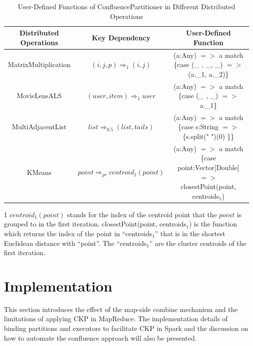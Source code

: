 \documentclass[10pt,journal,compsoc]{IEEEtran}
\begin{document}
\begin{table}[!t]
\begin{threeparttable}[b]
\renewcommand{\arraystretch}{1}
\caption{User-Defined Functions of ConfluencePartitioner in Different Distributed Operations}
\label{table:code}
\centering
\begin{tabularx}{1\textwidth}{ c || c |c  }
\hline
\textbf{Distributed Operations} & \textbf{Key Dependency} & \textbf{User-Defined Function} \\
\hline
MatrixMultiplication & $(i,j,p) \Rightarrow_{1} (i,j)$ & (a:Any) $=>$ a match \{case (\_ , \_, \_) $=>$ (a.\_1, a.\_2)\}\\
\hline
MovieLensALS  &$(user,item) \Rightarrow_{1} user$ & (a:Any) $=>$ a match \{case (\_ , \_) $=>$ a.\_1\} \\%
\hline
MultiAdjacentList  & $list \Rightarrow_{0.5} (list, tails)$ & (a:Any) $=>$ a match \{case s:String $=>$ \{s.split(" ")(0) \}\}\\
\hline
KMeans & $point \Rightarrow_{pr} centroid_1(point)$ & (a:Any) $=>$ a match \{case point:Vector[Double] $=>$ closestPoint(point, centroids$_1$)\tnote{1}\\
\hline
\end{tabularx}
\begin{tablenotes}
    \item[1] $centroid_1(point)$ stands for the index of the centroid point that the $point$ is grouped to in the first iteration.
    closestPoint(point, centroids$_1$) is the function which returns the index of the point in ``centroids$_1$'' that is in the shortest Euclidean distance with ``point''. The ``centroids$_1$'' are the cluster centroids of the first iteration. 
  \end{tablenotes}
\end{threeparttable}
\end{table}

\section{Implementation}\label{section:implement}
This section introduces the effect of the map-side combine mechanism and the
limitations of applying CKP in MapReduce.
The implementation details of binding partitions and executors to
facilitate CKP in Spark and the discussion on how to automate
the confluence approach will also be presented.
\end{document}
